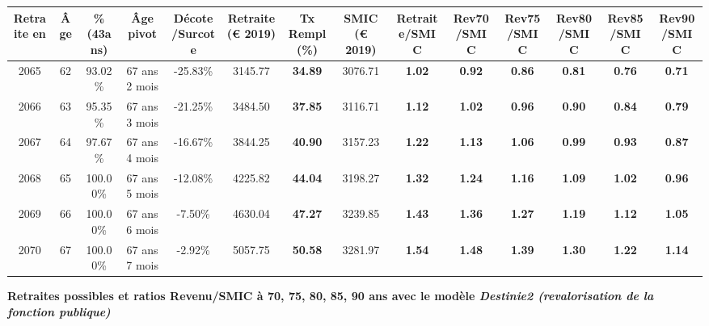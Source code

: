 \begin{adjustbox}{max width=\textwidth} 
\begin{tabular}[htb]{|c|c||c|c|c||c|c||c||c|c|c|c|c|c|} 
\hline 
 Retraite en &  Âge &  \%(43ans) &  Âge pivot &  Décote/Surcote &  Retraite (\euro{} 2019) &  Tx Rempl(\%) &  SMIC (\euro{} 2019) &  Retraite/SMIC &  Rev70/SMIC &  Rev75/SMIC &  Rev80/SMIC &  Rev85/SMIC &  Rev90/SMIC \\ 
\hline \hline 
 2065 &  62 &  93.02\% &  67 ans 2 mois &  -25.83\% &  3145.77 &  {\bf 34.89} &  3076.71 &  {\bf 1.02} &  {\bf {\color{red} 0.92}} &  {\bf {\color{red} 0.86}} &  {\bf {\color{red} 0.81}} &  {\bf {\color{red} 0.76}} &  {\bf {\color{red} 0.71}} \\ 
\hline 
 2066 &  63 &  95.35\% &  67 ans 3 mois &  -21.25\% &  3484.50 &  {\bf 37.85} &  3116.71 &  {\bf 1.12} &  {\bf 1.02} &  {\bf {\color{red} 0.96}} &  {\bf {\color{red} 0.90}} &  {\bf {\color{red} 0.84}} &  {\bf {\color{red} 0.79}} \\ 
\hline 
 2067 &  64 &  97.67\% &  67 ans 4 mois &  -16.67\% &  3844.25 &  {\bf 40.90} &  3157.23 &  {\bf 1.22} &  {\bf 1.13} &  {\bf 1.06} &  {\bf {\color{red} 0.99}} &  {\bf {\color{red} 0.93}} &  {\bf {\color{red} 0.87}} \\ 
\hline 
 2068 &  65 &  100.00\% &  67 ans 5 mois &  -12.08\% &  4225.82 &  {\bf 44.04} &  3198.27 &  {\bf 1.32} &  {\bf 1.24} &  {\bf 1.16} &  {\bf 1.09} &  {\bf 1.02} &  {\bf {\color{red} 0.96}} \\ 
\hline 
 2069 &  66 &  100.00\% &  67 ans 6 mois &  -7.50\% &  4630.04 &  {\bf 47.27} &  3239.85 &  {\bf 1.43} &  {\bf 1.36} &  {\bf 1.27} &  {\bf 1.19} &  {\bf 1.12} &  {\bf 1.05} \\ 
\hline 
 2070 &  67 &  100.00\% &  67 ans 7 mois &  -2.92\% &  5057.75 &  {\bf 50.58} &  3281.97 &  {\bf 1.54} &  {\bf 1.48} &  {\bf 1.39} &  {\bf 1.30} &  {\bf 1.22} &  {\bf 1.14} \\ 
\hline 
\hline 
\end{tabular} 
\end{adjustbox} 
 
 \vspace{0.1cm} 
{\bf \noindent Retraites possibles et ratios Revenu/SMIC à 70, 75, 80, 85, 90 ans avec le modèle \emph{Destinie2 (revalorisation de la fonction publique)}}  
 
